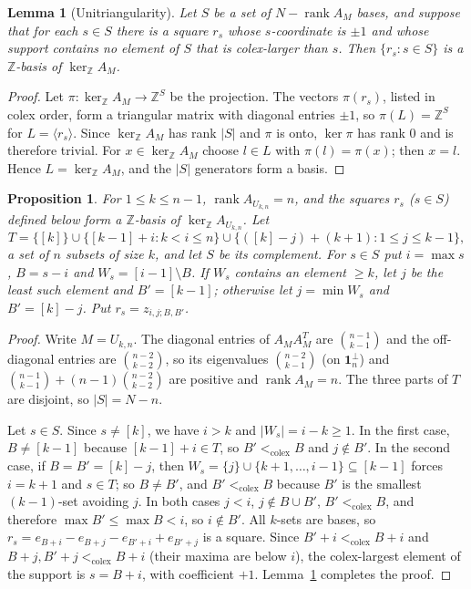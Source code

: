 \documentclass[11pt,a4paper]{article}
\theoremstyle{plain}
\newtheorem{lemma}[theorem]{Lemma}
\newtheorem{proposition}[theorem]{Proposition}
\theoremstyle{definition}
\newcommand{\Z}{\mathbb Z}
\newcommand{\AM}{A_M}
\newcommand{\kerZ}{\ker_{\Z}\!A_M}
\newcommand{\rank}{\operatorname{rank}}
\newcommand{\ind}{\mathbf 1}
\newcommand{\colex}{<_{\mathrm{colex}}}
\begin{document}
\begin{lemma}[Unitriangularity]\label{lem:unitri}
Let $S$ be a set of $N-\rank\AM$ bases, and suppose that for each $s\in S$ there is a square $r_s$ whose $s$-coordinate is $\pm1$ and whose support contains no element of $S$ that is colex-larger than $s$. Then $\{r_s:s\in S\}$ is a $\Z$-basis of $\kerZ$.
\end{lemma}
\begin{proof}
Let $\pi:\kerZ\to\Z^S$ be the projection. The vectors $\pi(r_s)$, listed in colex order, form a triangular matrix with diagonal entries $\pm1$, so $\pi(L)=\Z^S$ for $L=\langle r_s\rangle$. Since $\kerZ$ has rank $|S|$ and $\pi$ is onto, $\ker\pi$ has rank $0$ and is therefore trivial. For $x\in\kerZ$ choose $l\in L$ with $\pi(l)=\pi(x)$; then $x=l$. Hence $L=\kerZ$, and the $|S|$ generators form a basis.
\end{proof}

\begin{proposition}\label{prop:uniform}
For $1\le k\le n-1$, $\rank A_{U_{k,n}}=n$, and the squares $r_s$ ($s\in S$) defined below form a $\Z$-basis of $\ker_\Z A_{U_{k,n}}$. Let
\[
T=\{[k]\}\cup\{[k-1]+i:k<i\le n\}\cup\{([k]-j)+(k+1):1\le j\le k-1\},
\]
a set of $n$ subsets of size $k$, and let $S$ be its complement. For $s\in S$ put $i=\max s$, $B=s-i$ and $W_s=[i-1]\setminus B$. If $W_s$ contains an element $\ge k$, let $j$ be the least such element and $B'=[k-1]$; otherwise let $j=\min W_s$ and $B'=[k]-j$. Put $r_s=z_{i,j;B,B'}$.
\end{proposition}
\begin{proof}
Write $M=U_{k,n}$. The diagonal entries of $\AM\AM^{T}$ are $\binom{n-1}{k-1}$ and the off-diagonal entries are $\binom{n-2}{k-2}$, so its eigenvalues $\binom{n-2}{k-1}$ (on $\ind_n^{\perp}$) and $\binom{n-1}{k-1}+(n-1)\binom{n-2}{k-2}$ are positive and $\rank\AM=n$. The three parts of $T$ are disjoint, so $|S|=N-n$.

Let $s\in S$. Since $s\ne[k]$, we have $i>k$ and $|W_s|=i-k\ge1$. In the first case, $B\ne[k-1]$ because $[k-1]+i\in T$, so $B'\colex B$ and $j\notin B'$. In the second case, if $B=B'=[k]-j$, then $W_s=\{j\}\cup\{k+1,\dots,i-1\}\subseteq[k-1]$ forces $i=k+1$ and $s\in T$; so $B\ne B'$, and $B'\colex B$ because $B'$ is the smallest $(k-1)$-set avoiding $j$. In both cases $j<i$, $j\notin B\cup B'$, $B'\colex B$, and therefore $\max B'\le\max B<i$, so $i\notin B'$. All $k$-sets are bases, so $r_s=e_{B+i}-e_{B+j}-e_{B'+i}+e_{B'+j}$ is a square. Since $B'+i\colex B+i$ and $B+j,B'+j\colex B+i$ (their maxima are below $i$), the colex-largest element of the support is $s=B+i$, with coefficient $+1$. Lemma~\ref{lem:unitri} completes the proof.
\end{proof}
\end{document}
